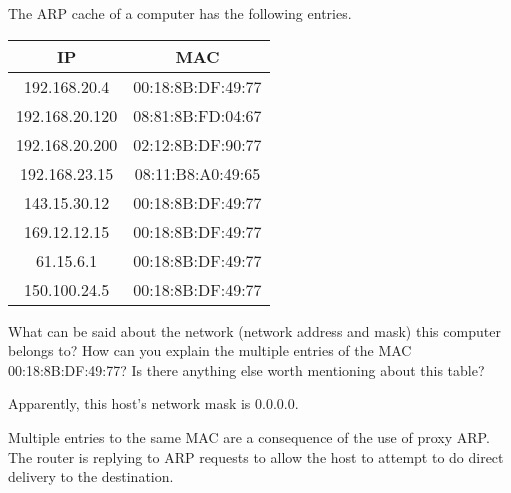 \begin{Exercise}
The ARP cache of a computer has the following entries.

\begin{center}
\begin{tabular}{c|c}
            IP & MAC               \\ \hline
  192.168.20.4 & 00:18:8B:DF:49:77 \\
192.168.20.120 & 08:81:8B:FD:04:67 \\
192.168.20.200 & 02:12:8B:DF:90:77 \\
 192.168.23.15 & 08:11:B8:A0:49:65 \\
  143.15.30.12 & 00:18:8B:DF:49:77 \\
  169.12.12.15 & 00:18:8B:DF:49:77 \\
     61.15.6.1 & 00:18:8B:DF:49:77 \\
  150.100.24.5 & 00:18:8B:DF:49:77 \\
\end{tabular}
\end{center}

What can be said about the network (network address and mask) this computer belongs to?
How can you explain the multiple entries of the MAC 00:18:8B:DF:49:77?
Is there anything else worth mentioning about this table?
\end{Exercise}
\begin{Answer}
Apparently, this host's network mask is 0.0.0.0.

Multiple entries to the same MAC are a consequence of the use of proxy ARP.
The router is replying to ARP requests to allow the host to attempt to do direct delivery to the destination.
\end{Answer}

